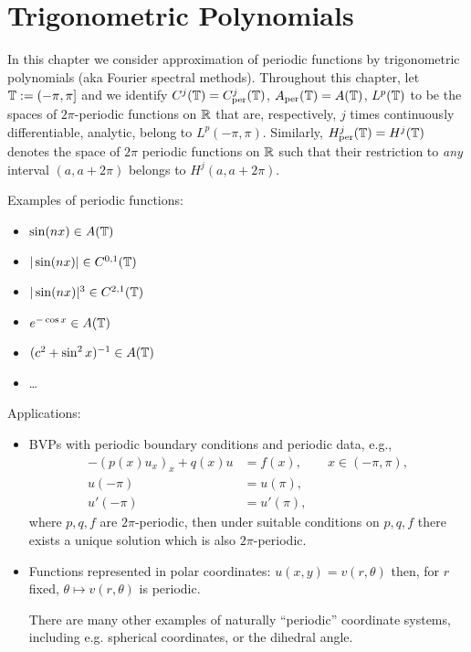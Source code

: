 

\section{Trigonometric Polynomials}
%
\label{sec:trig}
%
In this chapter we consider approximation of periodic functions by trigonometric
polynomials (aka Fourier spectral methods). Throughout this chapter, let $\mathbb{T} :=
(-\pi, \pi]$ and we identify $C^j(\mathbb{T}) = C^j_{\rm per}(\mathbb{T})$, $A_{\rm per}(\mathbb{T}) =
A(\mathbb{T})$, $L^p(\mathbb{T})$ to be the spaces of $2\pi$-periodic functions on $\mathbb{R}$ that
are, respectively, $j$ times  continuously differentiable, analytic, belong
to $L^p(-\pi, \pi)$. Similarly, $H^j_{\rm per}(\mathbb{T}) = H^j(\mathbb{T})$ denotes the
space of $2\pi$ periodic functions on $\mathbb{R}$ such that their restriction to {\em
any} interval $(a, a+2\pi)$ belongs to $H^j(a,a+2\pi)$.

Examples of periodic functions:
\begin{itemize}
  \item $\sin(nx) \in A(\mathbb{T})$
  \item $|\sin(nx)| \in C^{0,1}(\mathbb{T})$
  \item $|\sin(nx)|^3 \in C^{2,1}(\mathbb{T})$
  \item $e^{-\cos x} \in A(\mathbb{T})$
  \item $(c^2+\sin^2 x)^{-1} \in A(\mathbb{T})$
  \item \dots
\end{itemize}

Applications:
\begin{itemize}
  \item BVPs with periodic boundary conditions and periodic data, e.g.,
  \begin{align*}
      - (p(x) u_{x})_x + q(x) u &= f(x), \qquad x \in (-\pi, \pi), \\
      u(-\pi) &= u(\pi), \\
      u'(-\pi) &= u'(\pi),
  \end{align*}
  where $p, q, f$ are $2\pi$-periodic, then under suitable conditions on
  $p, q, f$ there exists a unique solution which is also $2\pi$-periodic.
  \item Functions represented in polar coordinates: $u(x, y) = v(r, \theta)$
  then, for $r$ fixed, $\theta \mapsto v(r, \theta)$ is periodic.

  There are many other examples of naturally ``periodic'' coordinate systems,
  including e.g. spherical coordinates, or the dihedral angle.
\end{itemize}

